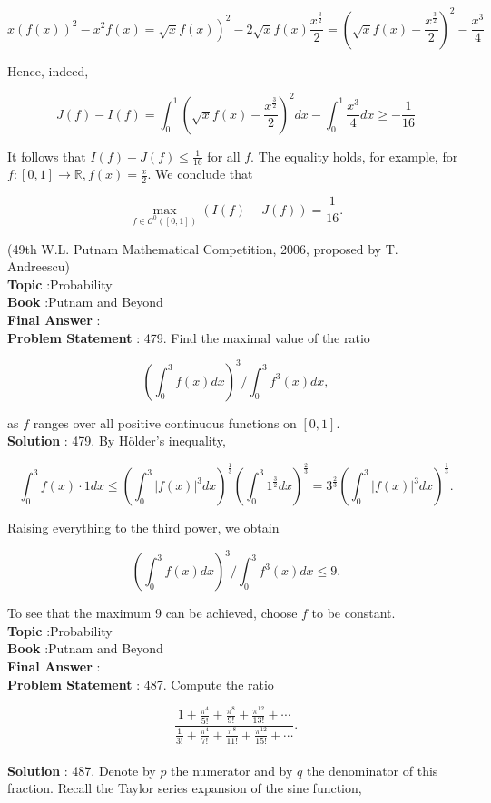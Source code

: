 \documentclass[10pt]{article}
\begin{document}
$$
\left.x(f(x))^{2}-x^{2} f(x)=\sqrt{x} f(x)\right)^{2}-2 \sqrt{x} f(x) \frac{x^{\frac{3}{2}}}{2}=\left(\sqrt{x} f(x)-\frac{x^{\frac{3}{2}}}{2}\right)^{2}-\frac{x^{3}}{4}
$$

Hence, indeed,

$$
J(f)-I(f)=\int_{0}^{1}\left(\sqrt{x} f(x)-\frac{x^{\frac{3}{2}}}{2}\right)^{2} d x-\int_{0}^{1} \frac{x^{3}}{4} d x \geq-\frac{1}{16}
$$

It follows that $I(f)-J(f) \leq \frac{1}{16}$ for all $f$. The equality holds, for example, for $f:[0,1] \rightarrow \mathbb{R}, f(x)=\frac{x}{2}$. We conclude that

$$
\max _{f \in \mathcal{C}^{0}([0,1])}(I(f)-J(f))=\frac{1}{16} .
$$

(49th W.L. Putnam Mathematical Competition, 2006, proposed by T. Andreescu) 
\\
\textbf{Topic} :Probability\\
\textbf{Book} :Putnam and Beyond\\
\textbf{Final Answer} :\\


\textbf{Problem Statement} :
479. Find the maximal value of the ratio

$$
\left(\int_{0}^{3} f(x) d x\right)^{3} / \int_{0}^{3} f^{3}(x) d x,
$$

as $f$ ranges over all positive continuous functions on $[0,1]$. 
\\
\textbf{Solution} :
479. By Hölder's inequality,

$$
\int_{0}^{3} f(x) \cdot 1 d x \leq\left(\int_{0}^{3}|f(x)|^{3} d x\right)^{\frac{1}{3}}\left(\int_{0}^{3} 1^{\frac{3}{2}} d x\right)^{\frac{2}{3}}=3^{\frac{2}{3}}\left(\int_{0}^{3}|f(x)|^{3} d x\right)^{\frac{1}{3}} .
$$

Raising everything to the third power, we obtain

$$
\left(\int_{0}^{3} f(x) d x\right)^{3} / \int_{0}^{3} f^{3}(x) d x \leq 9 .
$$

To see that the maximum 9 can be achieved, choose $f$ to be constant.
\\
\textbf{Topic} :Probability\\
\textbf{Book} :Putnam and Beyond\\
\textbf{Final Answer} :\\


\textbf{Problem Statement} :
487. Compute the ratio

$$
\frac{1+\frac{\pi^{4}}{5 !}+\frac{\pi^{8}}{9 !}+\frac{\pi^{12}}{13 !}+\cdots}{\frac{1}{3 !}+\frac{\pi^{4}}{7 !}+\frac{\pi^{8}}{11 !}+\frac{\pi^{12}}{15 !}+\cdots} .
$$
\\
\textbf{Solution} :
487. Denote by $p$ the numerator and by $q$ the denominator of this fraction. Recall the Taylor series expansion of the sine function,
\end{document}
